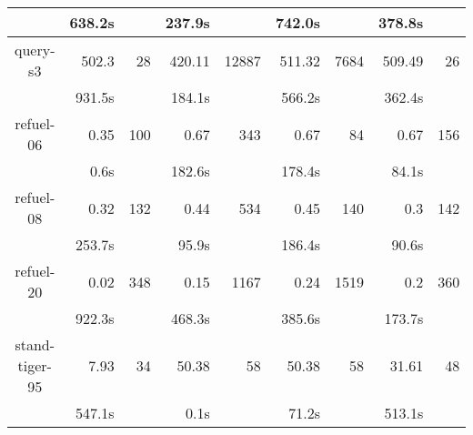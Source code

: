 \begin{table}
\begin{tabular}{|c|rr|rr|rr|rr|}
 & 638.2s & & 237.9s & & 742.0s & & 378.8s & \\
\hline
query-s3 & 502.3 & 28 & 420.11 & 12887 & 511.32 & 7684 & 509.49 & 26 \\
 & 931.5s & & 184.1s & & 566.2s & & 362.4s & \\
\hline
refuel-06 & 0.35 & 100 & 0.67 & 343 & 0.67 & 84 & 0.67 & 156 \\
 & 0.6s & & 182.6s & & 178.4s & & 84.1s & \\
\hline
refuel-08 & 0.32 & 132 & 0.44 & 534 & 0.45 & 140 & 0.3 & 142 \\
 & 253.7s & & 95.9s & & 186.4s & & 90.6s & \\
\hline
refuel-20 & 0.02 & 348 & 0.15 & 1167 & 0.24 & 1519 & 0.2 & 360 \\
 & 922.3s & & 468.3s & & 385.6s & & 173.7s & \\
\hline
stand-tiger-95 & 7.93 & 34 & 50.38 & 58 & 50.38 & 58 & 31.61 & 48 \\
 & 547.1s & & 0.1s & & 71.2s & & 513.1s & \\
\hline
\end{tabular}
\end{table}

